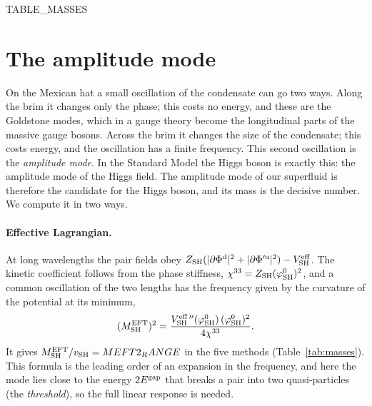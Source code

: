 \documentclass[aps,prd,twocolumn,superscriptaddress,nofootinbib,floatfix,longbibliography]{revtex4-2}
\newcommand{\LL}{{\rm LL}}
\newcommand{\SH}{{\rm SH}}
\begin{document}
\begin{table}[t]
\caption{The scale and the masses, second version: $v_\SH$ (units of $\Lambda_\LL$), the cutoff, $\rho_\SH$, and the
amplitude mode from the effective Lagrangian ($M^{\rm EFT}_\SH$, all methods) and from the linear response
($\omega^{\rm H}_\SH$, the pairing-only methods), relative to the scale and in GeV. The Standard Model has
$m_H/v={{MH_SM_V}}$.}
\label{tab:masses}
\begin{ruledtabular}
{{TABLE_MASSES}}
\end{ruledtabular}
\end{table}

\section{The amplitude mode}
\label{sec:amplitude}

On the Mexican hat a small oscillation of the condensate can go two ways. Along the brim it changes only the phase; this
costs no energy, and these are the Goldstone modes, which in a gauge theory become the longitudinal parts of the massive
gauge bosons. Across the brim it changes the size of the condensate; this costs energy, and the oscillation has a finite
frequency. This second oscillation is the \emph{amplitude mode}. In the Standard Model the Higgs boson is exactly this:
the amplitude mode of the Higgs field. The amplitude mode of our superfluid is therefore the candidate for the Higgs
boson, and its mass is the decisive number. We compute it in two ways.

\paragraph*{Effective Lagrangian.}
At long wavelengths the pair fields obey $Z_\SH(|\partial\Phi^{\rm d}|^2+|\partial\Phi'^{\rm u}|^2)-V^{\rm eff}_\SH$. The
kinetic coefficient follows from the phase stiffness, $\chi^{33}=Z_\SH(\varphi^0_\SH)^2$, and a common oscillation of
the two lengths has the frequency given by the curvature of the potential at its minimum,
\begin{equation}
(M^{\rm EFT}_\SH)^2=\frac{V^{\rm eff\,\prime\prime}_\SH(\varphi^0_\SH)\,(\varphi^0_\SH)^2}{4\chi^{33}} .
\label{eq:MEFT}
\end{equation}
It gives $M^{\rm EFT}_\SH/v_\SH={{MEFT2_RANGE}}$ in the five methods (Table~\ref{tab:masses}). This formula is the
leading order of an expansion in the frequency, and here the mode lies close to the energy $2E^{\rm gap}$ that breaks a
pair into two quasi-particles (the \emph{threshold}), so the full linear response is needed.
\end{document}
